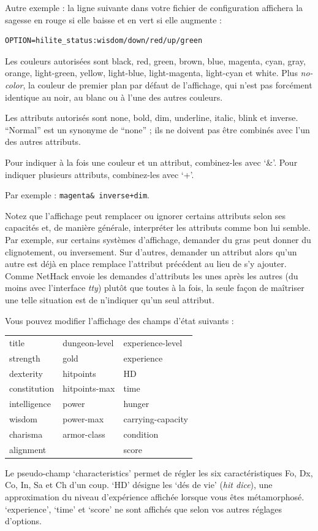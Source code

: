 \documentclass[titlepage]{article}
\begin{document}
Autre exemple : la ligne suivante dans votre fichier de configuration affichera
la sagesse en rouge si elle baisse et en vert si elle augmente :\\
\begin{verbatim}
OPTION=hilite_status:wisdom/down/red/up/green
\end{verbatim}

Les couleurs autorisées sont black, red, green, brown, blue, magenta, cyan, gray,
orange, light-green, yellow, light-blue, light-magenta, light-cyan et white.
Plus \textit{no-color}, la couleur de premier plan par défaut de l'affichage, qui
n'est pas forcément identique au noir, au blanc ou à l'une des autres couleurs.

Les attributs autorisés sont none, bold, dim, underline, italic, blink et inverse.
``Normal'' est un synonyme de ``none'' ; ils ne doivent pas être combinés
avec l'un des autres attributs.

Pour indiquer à la fois une couleur et un attribut, combinez-les avec `\&'.
Pour indiquer plusieurs attributs, combinez-les avec `+'.

Par exemple : \texttt{magenta\& inverse+dim}.

Notez que l'affichage peut remplacer ou ignorer certains attributs
selon ses capacités et, de manière générale, interpréter les
attributs comme bon lui semble.
Par exemple, sur certains systèmes d'affichage, demander du gras peut donner
du clignotement, ou inversement.
Sur d'autres, demander un attribut alors qu'un autre est déjà
en place remplace l'attribut précédent au lieu de s'y ajouter.
Comme NetHack envoie les demandes d'attributs les unes après les autres (du moins
avec l'interface \textit{tty}) plutôt que toutes à la fois, la seule façon de
maîtriser une telle situation est de n'indiquer qu'un seul attribut.

Vous pouvez modifier l'affichage des champs d'état suivants :
\begin{center}
\begin{tabular}{lll}
title & dungeon-level & experience-level\\
strength & gold & experience\\
dexterity & hitpoints & HD\\
constitution & hitpoints-max & time\\
intelligence & power & hunger\\
wisdom & power-max & carrying-capacity\\
charisma & armor-class & condition\\
alignment &  & score\\
\end{tabular}
\end{center}
Le pseudo-champ `characteristics' permet de régler les six
caractéristiques Fo, Dx, Co, In, Sa et Ch d'un coup.  `HD' désigne les
`dés de vie' (\textit{hit dice}), une approximation du niveau d'expérience affichée
lorsque vous êtes métamorphosé.
`experience', `time' et `score' ne sont affichés que
selon vos autres réglages d'options.
\end{document}
